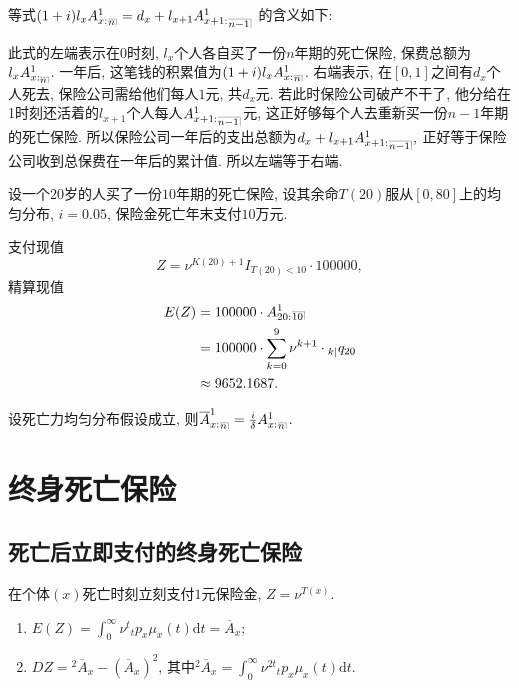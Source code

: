 \documentclass[lang=cn,10pt]{elegantbook}
\makeatletter
\DeclareRobustCommand{\annu}[1]{_{%
    \def\arraystretch{0}%
    \setlength\arraycolsep{1pt}%
    \setlength\arrayrulewidth{.2pt}%
    \begin{array}[b]{@{}c|}\hline
        \\[\arraycolsep]%
        \scriptstyle #1%
    \end{array}%
}}
\makeatother
\begin{document}
\begin{remark}
	等式$(1+i)l_x A_{x:}^1{}_{\annu{n}} = d_x + l_{x+1} A_{x+1:}^1{}_{\annu{n-1}}$ 的含义如下:
  
  此式的左端表示在0时刻, $l_x$个人各自买了一份$n$年期的死亡保险, 保费总额为$l_x A_{x:\annu{n}}^1$. 一年后, 这笔钱的积累值为$(1+i)l_x A_{x:}^1{}_{\annu{n}}$. 右端表示, 在$[0,1]$之间有$d_x$个人死去, 保险公司需给他们每人$1$元, 共$d_x$元. 若此时保险公司破产不干了, 他分给在1时刻还活着的$l_{x+1}$个人每人$A_{x+1:}^1{}_{\annu{n-1}}$元, 这正好够每个人去重新买一份$n-1$年期的死亡保险. 所以保险公司一年后的支出总额为$d_x + l_{x+1} A_{x+1:}^1{}_{\annu{n-1}},$ 正好等于保险公司收到总保费在一年后的累计值. 所以左端等于右端.
  \end{remark}

\begin{example}
    设一个$20$岁的人买了一份$10$年期的死亡保险, 设其余命$T(20)$服从$[0,80]$上的均匀分布, $i = 0.05$, 保险金死亡年末支付$10$万元.
\end{example}
\begin{solution}
	支付现值
    $$
        Z = \nu^{K(20)+1}I_{T(20)<10}\cdot 100000,
    $$
    精算现值
    \begin{align*}
        E(Z) & = 100000\cdot A_{20:}^1{}\annu{10}                         \\
             & = 100000\cdot \sum_{k=0}^{9}{\nu^{k+1}\cdot {}_{k|}q_{20}} \\
             & \approx 9652.1687.
    \end{align*}
\end{solution}

\begin{proposition}[死亡年末支付与死亡立即支付的关系]
	设死亡力均匀分布假设成立, 则$\overline{A}_{x:}^1{}_{\annu{n}}= \frac{i}{\delta}A_{x:}^1{}_{\annu{n}}$.
\end{proposition}

\section{终身死亡保险}
\subsection{死亡后立即支付的终身死亡保险}
\begin{definition}[支付现值]
	在个体$(x)$死亡时刻立刻支付$1$元保险金, $Z = \nu^{T(x)}.$
\end{definition}

\begin{proposition}[精算现值与方差]
	\begin{enumerate}
		\item $E(Z) = \int_0^\infty \nu^t{}_tp_x\mu_x(t)\mathrm{d}t = \overline{A}_x;$
		\item $DZ = {}^2\overline{A}_x - (\overline{A}_x)^2$, 其中${}^2\overline{A}_x = \int_0^\infty \nu^{2t}{}_tp_x\mu_x(t)\mathrm{d}t$.
	\end{enumerate}
\end{proposition}
\end{document}
